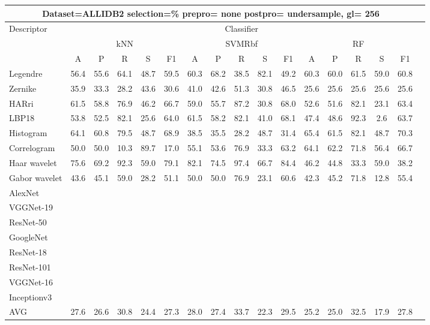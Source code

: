\documentclass[12pt,italian]{article}
\begin{document}
\begin{tiny}
\begin{longtable}{lcccccccccccccccc}
\toprule
\multicolumn{16}{c}{Dataset=ALLIDB2 selection=\% prepro= none postpro= undersample, gl= 256} \\ 
\toprule
Descriptor & \multicolumn{15}{c}{Classifier} \\ 
& \multicolumn{5}{c}{kNN} & \multicolumn{5}{c}{SVMRbf} & \multicolumn{5}{c}{RF} \\ 
& A & P & R & S & F1 & A & P & R & S & F1 & A & P & R & S & F1 \\ 
\midrule
Legendre & 56.4 & 55.6 & 64.1 & 48.7 & 59.5 & 60.3 & 68.2 & 38.5 & 82.1 & 49.2 & 60.3 & 60.0 & 61.5 & 59.0 & 60.8 \\ 
Zernike & 35.9 & 33.3 & 28.2 & 43.6 & 30.6 & 41.0 & 42.6 & 51.3 & 30.8 & 46.5 & 25.6 & 25.6 & 25.6 & 25.6 & 25.6 \\ 
HARri & 61.5 & 58.8 & 76.9 & 46.2 & 66.7 & 59.0 & 55.7 & 87.2 & 30.8 & 68.0 & 52.6 & 51.6 & 82.1 & 23.1 & 63.4 \\ 
LBP18 & 53.8 & 52.5 & 82.1 & 25.6 & 64.0 & 61.5 & 58.2 & 82.1 & 41.0 & 68.1 & 47.4 & 48.6 & 92.3 &  2.6 & 63.7 \\ 
Histogram & 64.1 & 60.8 & 79.5 & 48.7 & 68.9 & 38.5 & 35.5 & 28.2 & 48.7 & 31.4 & 65.4 & 61.5 & 82.1 & 48.7 & 70.3 \\ 
Correlogram & 50.0 & 50.0 & 10.3 & 89.7 & 17.0 & 55.1 & 53.6 & 76.9 & 33.3 & 63.2 & 64.1 & 62.2 & 71.8 & 56.4 & 66.7 \\ 
Haar wavelet & 75.6 & 69.2 & 92.3 & 59.0 & 79.1 & 82.1 & 74.5 & 97.4 & 66.7 & 84.4 & 46.2 & 44.8 & 33.3 & 59.0 & 38.2 \\ 
Gabor wavelet & 43.6 & 45.1 & 59.0 & 28.2 & 51.1 & 50.0 & 50.0 & 76.9 & 23.1 & 60.6 & 42.3 & 45.2 & 71.8 & 12.8 & 55.4 \\ 
AlexNet \\ 
VGGNet-19 \\ 
ResNet-50 \\ 
GoogleNet \\ 
ResNet-18 \\ 
ResNet-101 \\ 
VGGNet-16 \\ 
Inceptionv3 \\ 
\hline
AVG & 27.6 & 26.6 & 30.8 & 24.4 & 27.3 & 28.0 & 27.4 & 33.7 & 22.3 & 29.5 & 25.2 & 25.0 & 32.5 & 17.9 & 27.8 \\ 
\hline
\bottomrule
\end{longtable} 


\end{tiny}
\end{document}
